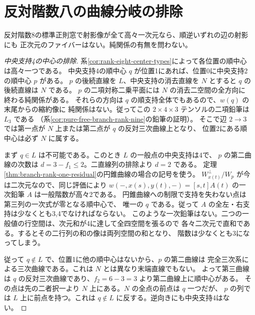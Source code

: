 \section{反対階数八の曲線分岐の排除}
\label{sec:rank-eight-branch-exclusion}
\begin{theorem}\label{thm:rank-eight-branch-exclusion}
反対階数8の標準正則窓で射影像が全て高々一次元なら、順逆いずれの辺の射影にも
正次元のファイバーはない。純関係の有無を問わない。
\end{theorem}
\begin{proof}[中央支持4の中心の排除]
系\ref{cor:rank-eight-center-types}によって各位置の順中心は高々一つである。
中央支持4の順中心 $q$ が位置1にあれば、位置0に中央支持2の順中心 $p$ がある。
$p$ の後続直線を $L$、中央支持の消去直線を $N$ とすると $q$ の後続直線は $N$ である。
$p$ の二項対称二乗平面には $N$ の消去二空間の全方向に終わる純関係がある。
それらの方向は $q$ の順支持全体でもあるので、$w(q)$ の末尾からの縮約像に
純関係はない。従ってこの $2\times4\times3$ テンソルの二項鉛筆は $L_3$ である
（系\ref{cor:pure-free-branch-rank-nine}の鉛筆の証明）。
そこで辺 $2\to3$ では第一点が $N$ 上または第二点が $q$ の反対三次曲線上となり、
位置2にある順中心は必ず $N$ に属する。

まず $q\in L$ は不可能である。このとき $L$ の一般点の中央支持は4で、
$p$ の第二曲線の次数は $d=3-f_1\le2$。二直線列の排除より $d=2$ である。
定理\ref{thm:branch-rank-one-residual}の円錐曲線の場合の記号を使う。
$W_{x(t)}^\perp/W_p$ が今は二次元なので、同じ評価により
$w(-,x(s),y(t),-)=[s,t]A(t)$ の一次鉛筆 $A$ は一般階数が高々2である。
円錐曲線への制限で支持を失わない点は第三列の一次式が零となる順中心で、
唯一の $q$ である。従って $A$ の全左・右支持は少なくとも3,4でなければならない。
このような一次鉛筆はない。二つの一般値の行空間は、次元和が4に達して全四空間を張るので
各々二次元で直和である。するとその二行列の和の像は両列空間の和となり、
階数は少なくとも3になってしまう。

従って $q\notin L$ で、位置1に他の順中心はないから、$p$ の第二曲線は
完全三次系による三次曲線である。これは $N$ とは異なり末端直線でもない。
よって第三曲線は $q$ の反対三次曲線であり、$f_2=6-3=3$ より第二曲線上に順中心がある。
その点は先の二者択一より $N$ 上にある。$N$ の全点の前点は $q$ 一つだが、
$p$ の列では $L$ 上に前点を持つ。これは $q\notin L$ に反する。逆向きにも中央支持4はない。
\end{proof}

